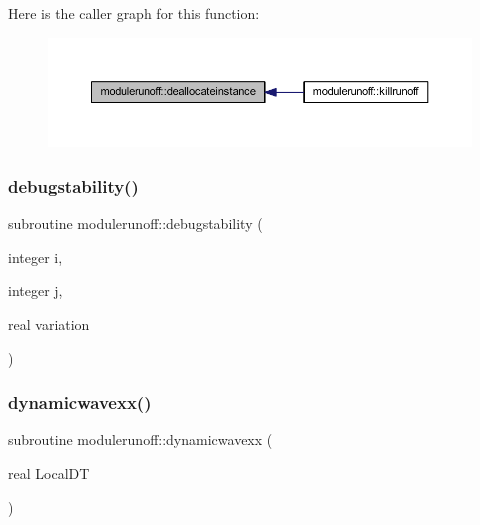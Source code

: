 Here is the caller graph for this function\+:
\nopagebreak
\begin{figure}[H]
\begin{center}
\leavevmode
\includegraphics[width=350pt]{namespacemodulerunoff_ad9192dfb595b8f16119a042aa13d95c4_icgraph}
\end{center}
\end{figure}
\mbox{\label{namespacemodulerunoff_ad470166654c51ff37fe83cafeef5a424}} 
\subsubsection{\texorpdfstring{debugstability()}{debugstability()}}
{\footnotesize\ttfamily subroutine modulerunoff\+::debugstability (\begin{DoxyParamCaption}\item[{integer}]{i,  }\item[{integer}]{j,  }\item[{real}]{variation }\end{DoxyParamCaption})\hspace{0.3cm}{\ttfamily [private]}}

\mbox{\label{namespacemodulerunoff_a18db45ec88a4cf69a97c7b95648bc264}} 
\subsubsection{\texorpdfstring{dynamicwavexx()}{dynamicwavexx()}}
{\footnotesize\ttfamily subroutine modulerunoff\+::dynamicwavexx (\begin{DoxyParamCaption}\item[{real}]{Local\+DT }\end{DoxyParamCaption})\hspace{0.3cm}{\ttfamily [private]}}

